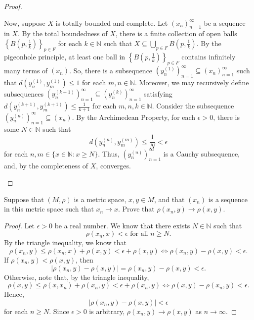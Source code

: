 \documentclass{article}
\begin{document}
\begin{proof}
\begin{enumerate}
		      Now, suppose \(X\) is totally bounded and complete.  Let
		      \((x_n)_{n=1}^{\infty}\) be a sequence in \(X\).  By the total
		      boundedness of \(X\), there is a finite collection of open balls
		      \(\left\{B\left(p, \frac{1}{k}\right)\right\}_{p\in F}\) for each
		      \(k\in \mathbb{N}\) such that \(X\subseteq \bigcup_{p\in F}
		      B\left(p, \frac{1}{k}\right)\).  By the pigeonhole principle, at
		      least one ball in \(\left\{B(p,\frac{1}{k})\right\}_{p\in F}\) contains
		      infinitely many terms of \((x_n)\).  So, there is a subsequence
		      \(\left(y_{n}^{(1)}\right)_{n=1}^{\infty}\subseteq (x_n)_{n=1}^{\infty}\) such that
		      \(d\left(y_{n}^{(1)}, y_{m}^{(1)}\right) \le 1\) for each
		      \(m,n\in \mathbb{N}\).  Moreover, we may recursively define
		      subsequences \(\left(y_{n}^{(k+1)}\right)_{n=1}^{\infty}\subseteq
		      \left(y_{n}^{(k)}\right)_{n=1}^{\infty}\) satisfying
		      \(d\left(y_{n}^{(k+1)}, y_{m}^{(k+1)}\right) \le \frac{1}{k+1}\) for each \(m,n,k\in
		      \mathbb{N}\).  Consider the subsequence
		      \(\left(y_n^{(n)}\right)_{n=1}^{\infty} \subseteq (x_n)\).  By the Archimedean
		      Property, for each \(\epsilon>0\), there is some \(N\in \mathbb{N}\)
		      such that
		      \[
			      d\left(y_{n}^{(n)}, y_{m}^{(m)}\right) \le \frac{1}{N} < \epsilon
		      \]
		      for each \(n, m \in \{x\in \mathbb{N} : x\ge N\}\).  Thus,
		      \(\left(y_n^{(n)}\right)_{n=1}^{\infty}\) is a Cauchy subsequence, and,
		      by the completeness of \(X\), converges.
	\end{enumerate}
\end{proof}

\begin{problem}[Fall 2004~\#4]
Suppose that \((M, \rho)\) is a metric space, \(x,y\in M\), and that \((x_n)\) is a
sequence in this metric space such that \(x_n\to x\). Prove that \(\rho(x_n ,
y)\to \rho(x, y)\).
\end{problem}
\begin{proof}
	Let \(\epsilon > 0\) be a real number.  We know that there exists \(N\in
	\mathbb{N}\) such that
	\[
		\rho(x_n,x) < \epsilon \text{ for all } n\ge N
		.\]
	By the triangle inequality, we know that
	\[
		\rho(x_n,y) \le \rho(x_n,x) + \rho(x,y) < \epsilon + \rho(x,y) \iff \rho(x_n,y) - \rho(x,y) < \epsilon
		.\]
	If \(\rho(x_n,y) < \rho(x,y)\), then
	\[
		|\rho(x_n, y) - \rho(x,y)| = \rho(x_n,y) - \rho(x,y) < \epsilon
		.\]
	Otherwise, note that, by the triangle inequality,
	\[
		\rho(x,y) \le \rho(x,x_n) + \rho(x_n,y) < \epsilon + \rho(x_n,y) \iff
		\rho(x,y) - \rho(x_n,y) < \epsilon
		.\]
	Hence,
	\[
		|\rho(x_n,y) - \rho(x,y)| < \epsilon
	\]
	for each \(n\ge N\).  Since \(\epsilon > 0\) is arbitrary, \(\rho(x_n,y)\to
	\rho(x,y)\) as \(n\to \infty\).
\end{proof}
\end{document}

